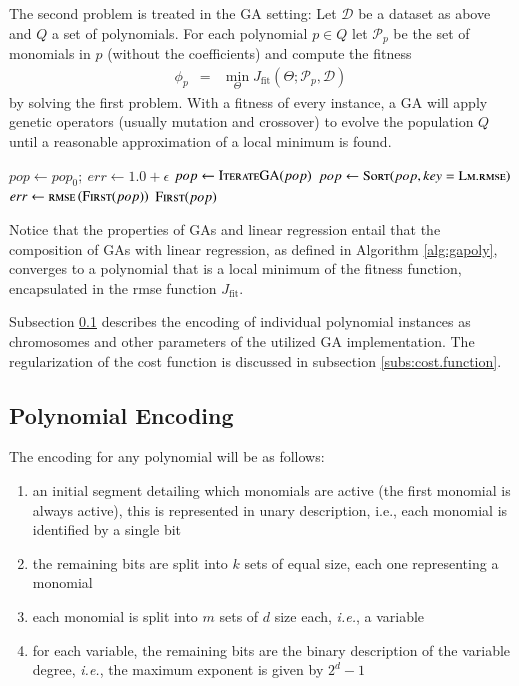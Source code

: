 \documentclass[draft,authoryear,3p,times,twocolumn]{elsarticle}
\begin{document}
The second problem is treated in the \ac{GA} setting: Let $\mathcal{D}$ be a dataset as above and $Q$ a set of polynomials. For each polynomial $p\in Q$ let $\mathcal{P}_p$ be the set of monomials in $p$ (without the coefficients) and compute the fitness
%
\begin{eqnarray*}
\phi_p &=& \min_\Theta J_{\textrm{fit}}\left(\Theta;\mathcal{P}_p,\mathcal{D}\right)
\end{eqnarray*}
%
by solving the first problem. With a fitness of every instance, a \ac{GA} will apply genetic operators (usually mutation and crossover) to evolve the population $Q$ until a reasonable approximation of a local minimum is found. 
%
\begin{algorithm}[tb]
\begin{algorithmic}
	\State $pop \gets pop_0;\: err \gets 1.0+\epsilon$
		\State $pop \gets \Call{IterateGA}{pop}$
		\State $pop \gets \Call{Sort}{pop, key = \textsc{Lm.rmse}}$
		\State $err \gets \textsc{rmse}\left(\Call{First}{pop}\right)$
	\EndWhile
	\State\Return $\Call{First}{pop}$
\EndFunction
\end{algorithmic}
\caption{\ac{GAPoly} uses linear regression to find monomial coefficients that minimize the \ac{rmse} over a dataset and \acp{GA} to explore the space of polynomials. At exit the \ac{rmse} of the fittest instance is bounded by $\epsilon$.}\label{alg:gapoly}
\end{algorithm} 
%
Notice that the properties of \acp{GA} and linear regression entail that
the composition of \acp{GA} with linear regression, as defined in Algorithm \ref{alg:gapoly}, converges to a polynomial that is a local minimum of the fitness function, encapsulated in the \ac{rmse} function $J_{\textrm{fit}}$.
%

%
Subsection \ref{subs:polynomial.encoding} describes the encoding of individual polynomial instances as chromosomes and other parameters of the utilized \ac{GA} implementation. The regularization of the cost function is discussed in subsection \ref{subs:cost.function}.

%
\subsection{Polynomial Encoding}\label{subs:polynomial.encoding}
%
The encoding for any polynomial will be as follows:
\begin{enumerate}
\item an initial segment detailing which monomials are active (the first monomial is always active), this is represented in unary description, i.e., each monomial is identified by a single bit
\item the remaining bits are split into $k$ sets of equal size, each one representing a monomial
\item each monomial is split into $m$ sets of $d$ size each, \emph{i.e.}, a variable
\item for each variable, the remaining bits are the binary description of the variable degree, \emph{i.e.}, the maximum exponent is given by $2^d-1$
\end{enumerate}
\end{document}
